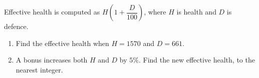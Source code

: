 Effective health is computed as $H\left(1+\dfrac{D}{100}\right)$, where $H$ is health and $D$ is defence.
\begin{enumerate}
\item[(a)] Find the effective health when $H=1570$ and $D=661$.
\item[(b)] A bonus increases both $H$ and $D$ by $5\%$. Find the new effective health, to the nearest integer.
\end{enumerate}

